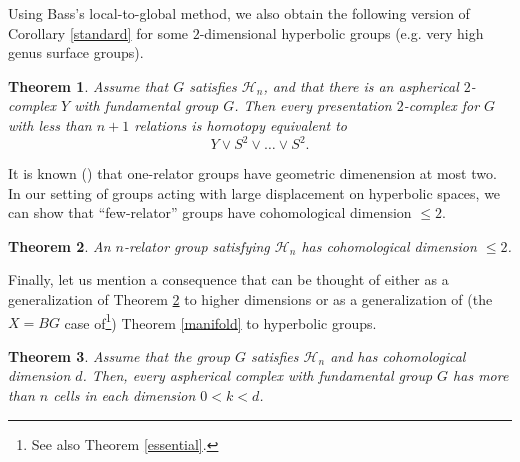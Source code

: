 \documentclass[11pt,letterpaper]{amsart}
\newtheorem{theorem}{Theorem}
\begin{document}
Using Bass's local-to-global method, we also obtain the following version of Corollary \ref{standard} for some $2$-dimensional hyperbolic groups (e.g. very high genus surface groups).
\begin{theorem}
\label{hypstandard}
Assume that $G$ satisfies $\mathcal H_{n}$, and that there is an aspherical $2$-complex $Y$ with fundamental group $G$. Then every presentation $2$-complex for $G$ with less than $n+1$ relations is homotopy equivalent to 
$$
Y\vee S^2\vee\dots\vee S^2.
$$
\end{theorem}
It is known (\cite{cohenlyndon}) that one-relator groups have geometric dimenension at most two. In our setting of groups acting with large displacement on hyperbolic spaces, we can show that ``few-relator'' groups have cohomological dimension $\leq 2$. %
\begin{theorem}
\label{fewrelator}
An $n$-relator group satisfying $\mathcal H_{n}$ has cohomological dimension $\leq 2$. 
\end{theorem}
Finally, let us mention a consequence that can be thought of either as a generalization of Theorem \ref{fewrelator} to higher dimensions or as a generalization of (the $X=BG$ case of\footnote{See also Theorem \ref{essential}.}) Theorem \ref{manifold} to hyperbolic groups.
\begin{theorem}
\label{cellbound}
Assume that the group $G$ satisfies $\mathcal H_{n}$ and has cohomological dimension $d$. Then, every aspherical complex with fundamental group $G$ has more than $n$ cells in each dimension $0<k<d$. 
\end{theorem} 
\end{document}
